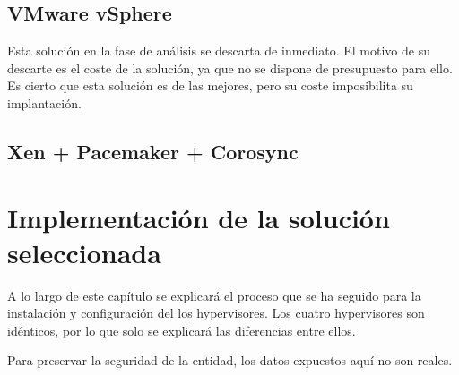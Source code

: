\documentclass[12pt,a4paper,titlepage,twoside]{report}
\begin{document}
\section{VMware vSphere}

Esta solución en la fase de análisis se descarta de inmediato. El motivo de su descarte es el coste de la solución, ya que no se dispone de presupuesto para ello. Es cierto que esta solución es de las mejores, pero su coste imposibilita su implantación.
\section{Xen + Pacemaker + Corosync}

\chapter{Implementación de la solución seleccionada}
\par A lo largo de este capítulo se explicará el proceso que se ha seguido para la instalación y configuración del los hypervisores. Los cuatro hypervisores son idénticos, por lo que solo se explicará las diferencias entre ellos. 
\par Para preservar la seguridad de la entidad, los datos expuestos aquí no son reales.
\end{document}
